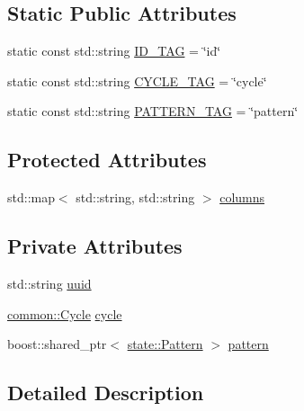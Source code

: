 \subsection*{\-Static \-Public \-Attributes}
\begin{DoxyCompactItemize}
\item 
static const std\-::string \hyperlink{classcryomesh_1_1manager_1_1PatternDatabaseObject_a3d300a264abb64a0f26e36818df0c228}{\-I\-D\-\_\-\-T\-A\-G} = \char`\"{}id\char`\"{}
\item 
static const std\-::string \hyperlink{classcryomesh_1_1manager_1_1PatternDatabaseObject_ac6763548916adb57eb5b03035049cc12}{\-C\-Y\-C\-L\-E\-\_\-\-T\-A\-G} = \char`\"{}cycle\char`\"{}
\item 
static const std\-::string \hyperlink{classcryomesh_1_1manager_1_1PatternDatabaseObject_ab032a924bb375d4ee41fe8d854d7d9db}{\-P\-A\-T\-T\-E\-R\-N\-\_\-\-T\-A\-G} = \char`\"{}pattern\char`\"{}
\end{DoxyCompactItemize}
\subsection*{\-Protected \-Attributes}
\begin{DoxyCompactItemize}
\item 
std\-::map$<$ std\-::string, \*
std\-::string $>$ \hyperlink{classcryomesh_1_1manager_1_1DatabaseObject_a9c648bf09b9fd8b4d599b0d4f4abf531}{columns}
\end{DoxyCompactItemize}
\subsection*{\-Private \-Attributes}
\begin{DoxyCompactItemize}
\item 
std\-::string \hyperlink{classcryomesh_1_1manager_1_1PatternDatabaseObject_a1bd568034f9f9d08b5ebb7386417f149}{uuid}
\item 
\hyperlink{classcryomesh_1_1common_1_1Cycle}{common\-::\-Cycle} \hyperlink{classcryomesh_1_1manager_1_1PatternDatabaseObject_aadaa9dab4b616e4780b3ca8119ba38b7}{cycle}
\item 
boost\-::shared\-\_\-ptr$<$ \hyperlink{classcryomesh_1_1state_1_1Pattern}{state\-::\-Pattern} $>$ \hyperlink{classcryomesh_1_1manager_1_1PatternDatabaseObject_a473ad5bb9f7b357f39337c1b8712ded6}{pattern}
\end{DoxyCompactItemize}


\subsection{\-Detailed \-Description}


